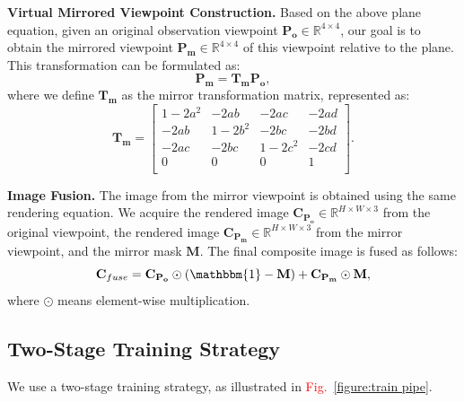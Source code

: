 \documentclass[conference]{IEEEtran}
\begin{document}
\textbf{Virtual Mirrored Viewpoint Construction.} Based on the above plane equation, given an original observation viewpoint $\mathbf{P_o} \in \mathbb{R} ^{4\times 4}$, our goal is to obtain the mirrored viewpoint $\mathbf{P_m} \in \mathbb{R} ^{4\times 4}$ of this viewpoint relative to the plane. This transformation can be formulated as: 
\begin{equation}
\label{eq: trans}
    \mathbf{P_m} = \mathbf{T_m} \mathbf{P_o},
\end{equation}
where we define $\mathbf{T_m}$ as the mirror transformation matrix, represented as:
\begin{equation}
    \mathbf{T_m} =\left[\begin{matrix}1-2a^2&-2ab&-2ac&-2ad\\-2ab&1-2b^2&-2bc&-2bd\\-2ac&-2bc&1-2c^2&-2cd\\0&0&0&1\\\end{matrix}\right].
\end{equation}

\textbf{Image Fusion.} The image from the mirror viewpoint is obtained using the same rendering equation. We acquire the rendered image $\mathbf{C}_{\mathbf{P_o}} \in \mathbb{R}^{H\times W\times3}$ from the original viewpoint, the rendered image $\mathbf{C}_{\mathbf{P_m}} \in \mathbb{R}^{H\times W\times3}$ from the mirror viewpoint, and the mirror mask $\mathbf{M}$. The final composite image is fused as follows:
\begin{equation}
    \mathbf{C}_{fuse}= \mathbf{C}_{\mathbf{P_o}} \odot  {(\mathbbm{1}-\mathbf{M}})+ \mathbf{C}_{\mathbf{P_m}} \odot \mathbf{M},
    \label{eq:fuse_image}
\end{equation}
where $\odot$ means element-wise multiplication.

\subsection{Two-Stage Training Strategy}
\label{sec:traing}

We use a two-stage training strategy, as illustrated in \textcolor{red}{Fig.~\ref{figure:train pipe}}.


\end{document}
